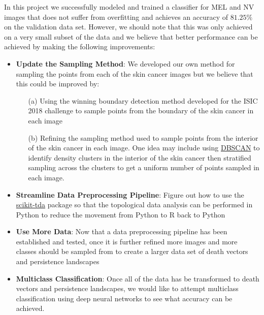 \documentclass[11pt, reqno]{amsart}
\theoremstyle{plain}
\theoremstyle{definition}
\begin{document}
In this project we successfully modeled and trained a classifier for MEL and NV images that does not suffer from overfitting and achieves an accuracy of $81.25\%$ on the validation data set. However, we should note that this was only achieved on a very small subset of the data and we believe that better performance can be achieved by making the following improvements:
\begin{itemize}
    \item {\bfseries Update the Sampling Method}: We developed our own method for sampling the points from each of the skin cancer images but we believe that this could be improved by:
    \begin{enumerate}
        \item[(a)] Using the winning boundary detection method developed for the ISIC 2018 challenge to sample points from the boundary of the skin cancer in each image
        \item[(b)] Refining the sampling method used to sample points from the interior of the skin cancer in each image. One idea may include using \href{https://scikit-learn.org/stable/modules/generated/sklearn.cluster.DBSCAN.html}{DBSCAN} to identify density clusters in the interior of the skin cancer then stratified sampling across the clusters to get a uniform number of points sampled in each image.
    \end{enumerate} 
    \item {\bfseries Streamline Data Preprocessing Pipeline}: Figure out how to use the \href{https://pypi.org/project/scikit-tda/}{scikit-tda} package so that the topological data analysis can be performed in Python to reduce the movement from Python to R back to Python
    \item {\bfseries Use More Data}: Now that a data preprocessing pipeline has been established and tested, once it is further refined more images and more classes should be sampled from to create a larger data set of death vectors and persistence landscapes
    \item {\bfseries Multiclass Classification}: Once all of the data has be transformed to death vectors and persistence landscapes, we would like to attempt multiclass classification using deep neural networks to see what accuracy can be achieved.
\end{itemize}



\end{document}

